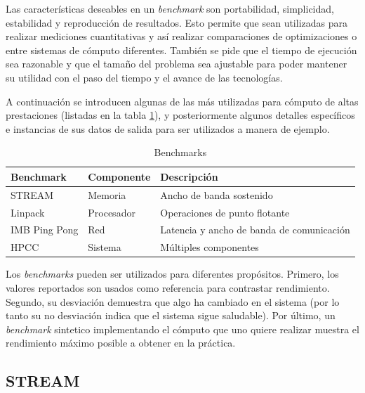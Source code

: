 \documentclass[a4paper]{report}
\begin{document}
\bigskip

Las caracter\'isticas deseables en un {\it benchmark} son portabilidad, simplicidad, estabilidad y
reproducci\'on de resultados. Esto permite que sean utilizadas para realizar
mediciones cuantitativas y as\'i realizar comparaciones de optimizaciones o
entre sistemas de c\'omputo diferentes. Tambi\'en se pide que el tiempo de
ejecuci\'on sea razonable y que el tama\~no del problema sea ajustable para
poder mantener su utilidad con el paso del tiempo y el avance de las
tecnolog\'ias.

\bigskip

A continuaci\'on se introducen algunas de las m\'as utilizadas para c\'omputo
de altas prestaciones (listadas en la tabla \ref{table:benchmark-list}),
y posteriormente algunos detalles espec\'ificos e instancias
de sus datos de salida para ser utilizados a manera de ejemplo.

\begin{table}[H]
    \caption{Benchmarks}
    \begin{center}
    \begin{tabular}{|l|l|l|}\hline
      {\bf Benchmark} & {\bf Componente} & {\bf Descripci\'on} \\ \hline
      STREAM & Memoria & Ancho de banda sostenido \\ \hline
      Linpack & Procesador & Operaciones de punto flotante \\ \hline
      IMB Ping Pong & Red & Latencia y ancho de banda de comunicaci\'on \\ \hline
      HPCC & Sistema & M\'ultiples componentes \\ \hline
        \end{tabular}
  \label{table:benchmark-list}
  \end{center}
\end{table}

\bigskip

Los {\it benchmarks} pueden ser utilizados para diferentes prop\'ositos. Primero,
los valores reportados son usados como referencia para contrastar rendimiento.
Segundo, su desviaci\'on demuestra que algo ha cambiado en el sistema (por lo tanto
su no desviaci\'on indica que el sistema sigue saludable). Por \'ultimo,
un {\it benchmark} sintetico implementando el c\'omputo que uno quiere realizar
muestra el rendimiento m\'aximo posible a obtener en la pr\'actica.

\subsection{STREAM}
\end{document}
